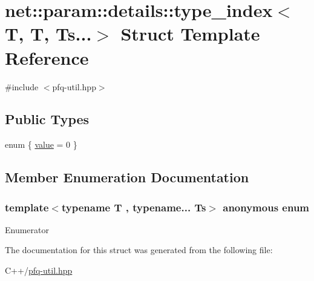 \hypertarget{structnet_1_1param_1_1details_1_1type__index_3_01T_00_01T_00_01Ts_8_8_8_4}{\section{net\-:\-:param\-:\-:details\-:\-:type\-\_\-index$<$ T, T, Ts...$>$ Struct Template Reference}
\label{structnet_1_1param_1_1details_1_1type__index_3_01T_00_01T_00_01Ts_8_8_8_4}
}


{\ttfamily \#include $<$pfq-\/util.\-hpp$>$}

\subsection*{Public Types}
\begin{DoxyCompactItemize}
\item 
enum \{ \hyperlink{structnet_1_1param_1_1details_1_1type__index_3_01T_00_01T_00_01Ts_8_8_8_4_a040ee215ab90caaa7c12ce856e2d2b2eac990fbaa04445effd47d0e46691f994e}{value} = 0
 \}
\end{DoxyCompactItemize}


\subsection{Member Enumeration Documentation}
\hypertarget{structnet_1_1param_1_1details_1_1type__index_3_01T_00_01T_00_01Ts_8_8_8_4_a040ee215ab90caaa7c12ce856e2d2b2e}{\subsubsection[{anonymous enum}]{\setlength{\rightskip}{0pt plus 5cm}template$<$typename T , typename... Ts$>$ anonymous enum}}\label{structnet_1_1param_1_1details_1_1type__index_3_01T_00_01T_00_01Ts_8_8_8_4_a040ee215ab90caaa7c12ce856e2d2b2e}
\begin{Desc}
\item[Enumerator]\par
\begin{description}
\item[{\em 
\hypertarget{structnet_1_1param_1_1details_1_1type__index_3_01T_00_01T_00_01Ts_8_8_8_4_a040ee215ab90caaa7c12ce856e2d2b2eac990fbaa04445effd47d0e46691f994e}{value}\label{structnet_1_1param_1_1details_1_1type__index_3_01T_00_01T_00_01Ts_8_8_8_4_a040ee215ab90caaa7c12ce856e2d2b2eac990fbaa04445effd47d0e46691f994e}
}]\end{description}
\end{Desc}


The documentation for this struct was generated from the following file\-:\begin{DoxyCompactItemize}
\item 
C++/\hyperlink{pfq-util_8hpp}{pfq-\/util.\-hpp}\end{DoxyCompactItemize}
